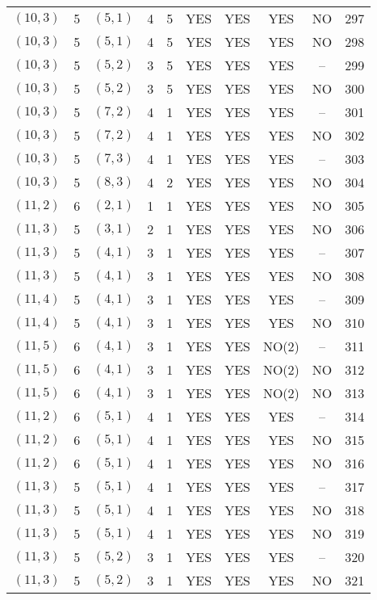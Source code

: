 \begin{longtable}{|c|c|c|c|c|c|c|c|c|c|}
$(10, 3)$ & 5 & $(5, 1)$ & 4 & 5 & YES & YES & YES & NO & 297\\
$(10, 3)$ & 5 & $(5, 1)$ & 4 & 5 & YES & YES & YES & NO & 298\\
$(10, 3)$ & 5 & $(5, 2)$ & 3 & 5 & YES & YES & YES & -- & 299\\
$(10, 3)$ & 5 & $(5, 2)$ & 3 & 5 & YES & YES & YES & NO & 300\\
$(10, 3)$ & 5 & $(7, 2)$ & 4 & 1 & YES & YES & YES & -- & 301\\
$(10, 3)$ & 5 & $(7, 2)$ & 4 & 1 & YES & YES & YES & NO & 302\\
$(10, 3)$ & 5 & $(7, 3)$ & 4 & 1 & YES & YES & YES & -- & 303\\
$(10, 3)$ & 5 & $(8, 3)$ & 4 & 2 & YES & YES & YES & NO & 304\\
$(11, 2)$ & 6 & $(2, 1)$ & 1 & 1 & YES & YES & YES & NO & 305\\
$(11, 3)$ & 5 & $(3, 1)$ & 2 & 1 & YES & YES & YES & NO & 306\\
$(11, 3)$ & 5 & $(4, 1)$ & 3 & 1 & YES & YES & YES & -- & 307\\
$(11, 3)$ & 5 & $(4, 1)$ & 3 & 1 & YES & YES & YES & NO & 308\\
$(11, 4)$ & 5 & $(4, 1)$ & 3 & 1 & YES & YES & YES & -- & 309\\
$(11, 4)$ & 5 & $(4, 1)$ & 3 & 1 & YES & YES & YES & NO & 310\\
$(11, 5)$ & 6 & $(4, 1)$ & 3 & 1 & YES & YES & NO(2) & -- & 311\\
$(11, 5)$ & 6 & $(4, 1)$ & 3 & 1 & YES & YES & NO(2) & NO & 312\\
$(11, 5)$ & 6 & $(4, 1)$ & 3 & 1 & YES & YES & NO(2) & NO & 313\\
$(11, 2)$ & 6 & $(5, 1)$ & 4 & 1 & YES & YES & YES & -- & 314\\
$(11, 2)$ & 6 & $(5, 1)$ & 4 & 1 & YES & YES & YES & NO & 315\\
$(11, 2)$ & 6 & $(5, 1)$ & 4 & 1 & YES & YES & YES & NO & 316\\
$(11, 3)$ & 5 & $(5, 1)$ & 4 & 1 & YES & YES & YES & -- & 317\\
$(11, 3)$ & 5 & $(5, 1)$ & 4 & 1 & YES & YES & YES & NO & 318\\
$(11, 3)$ & 5 & $(5, 1)$ & 4 & 1 & YES & YES & YES & NO & 319\\
$(11, 3)$ & 5 & $(5, 2)$ & 3 & 1 & YES & YES & YES & -- & 320\\
$(11, 3)$ & 5 & $(5, 2)$ & 3 & 1 & YES & YES & YES & NO & 321\\

\end{longtable}
